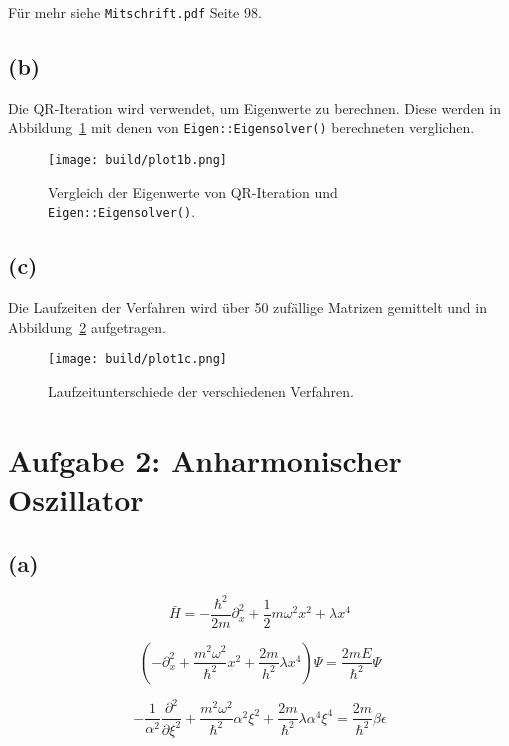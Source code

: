 \documentclass{scrartcl}
\begin{document}
Für mehr siehe \texttt{Mitschrift.pdf} Seite 98.


\subsection*{(b)}
Die QR-Iteration wird verwendet, um Eigenwerte zu berechnen.
Diese werden in Abbildung~\ref{fig:1b} mit denen von \texttt{Eigen::Eigensolver()} berechneten verglichen.
\begin{figure}[ht]
		\centering
		\texttt{[image: build/plot1b.png]}
		\caption{Vergleich der Eigenwerte von QR-Iteration und \texttt{Eigen::Eigensolver()}.}%
		\label{fig:1b}
\end{figure}

\subsection*{(c)}
Die Laufzeiten der Verfahren wird über 50 zufällige Matrizen gemittelt und in Abbildung~\ref{fig:1c} aufgetragen.
\begin{figure}[ht]
		\centering
		\texttt{[image: build/plot1c.png]}
		\caption{Laufzeitunterschiede der verschiedenen Verfahren.}%
		\label{fig:1c}
\end{figure}

\section*{Aufgabe 2: Anharmonischer Oszillator}
\subsection*{(a)}

\begin{equation}
		\bar{H} = - \frac{\hbar^2}{2m} \partial^2_x + \frac{1}{2} m \omega^2 x^2
		+ \lambda x^4
\end{equation}

\begin{equation}
		\left( - \partial_x^2 + \frac{m^2 \omega^2}{\hbar^2} x^2 + \frac{2m}{h^2}
		\lambda x^4 \right) \Psi = \frac{2 m  E}{\hbar^2} \Psi
\end{equation}

\begin{equation}
		- \frac{1}{\alpha^2} \frac{\partial^2}{\partial \xi^2} + \frac{m^2
		\omega^2}{\hbar^2} \alpha^2 \xi^2 + \frac{2m}{\hbar^2} \lambda \alpha^4
		\xi^4 = \frac{2m}{\hbar^2} \beta \epsilon
\end{equation}
\end{document}
